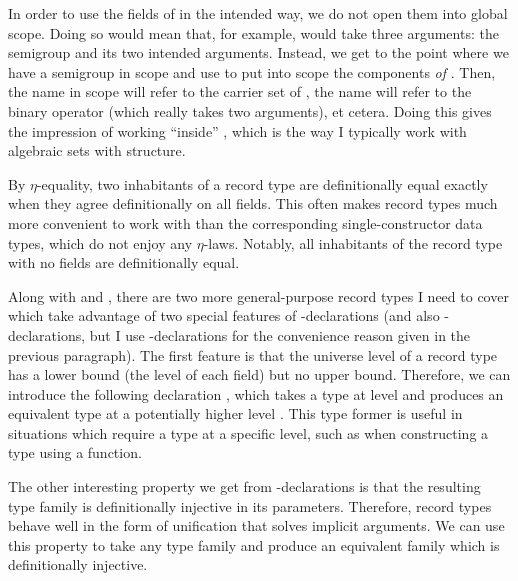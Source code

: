 
In order to use the fields of  in the intended way, we
do not open them into global scope.
Doing so would mean that, for example, \AgdaField{\_$\bullet$\_} would take
three arguments: the semigroup and its two intended arguments.
Instead, we get to the point where we have a semigroup  in scope
and use
\AgdaSpace{}\AgdaSpace{}
to put into scope the components \emph{of }.
Then, the name  in scope will refer to the carrier set of
, the name \AgdaField{\_$\bullet$\_} will refer to the binary
operator (which really takes two arguments), et cetera.
Doing this gives the impression of working ``inside'' , which is
the way I typically work with algebraic sets with structure.

By $\eta$-equality, two inhabitants of a record type are definitionally equal
exactly when they agree definitionally on all fields.
This often makes record types much more convenient to work with than the
corresponding single-constructor data types, which do not enjoy any $\eta$-laws.
Notably, all inhabitants of the record type \AgdaRecord{$\top$} with no fields
are definitionally equal.

Along with \AgdaRecord{$\Upsigma$} and \AgdaRecord{$\top$}, there are two more
general-purpose record types I need to cover which take advantage of two special
features of -declarations (and also
-declarations, but I use -declarations for
the convenience reason given in the previous paragraph).
The first feature is that the universe level of a record type has a lower bound
(the level of each field) but no upper bound.
Therefore, we can introduce the following declaration , which
takes a type  at level  and produces an equivalent
type at a potentially higher level
\AgdaSpace{}\AgdaOperator{\AgdaPrimitive{$\sqcup$}}\AgdaSpace{}%
\AgdaBound{$\ell$}.
This type former is useful in situations which require a type at a specific
level, such as when constructing a type using a function.


The other interesting property we get from -declarations is
that the resulting type family is definitionally injective in its parameters.
Therefore, record types behave well in the form of unification that solves
implicit arguments.
We can use this property to take any type family  and produce an
equivalent family \AgdaSpace{} which is
definitionally injective.


